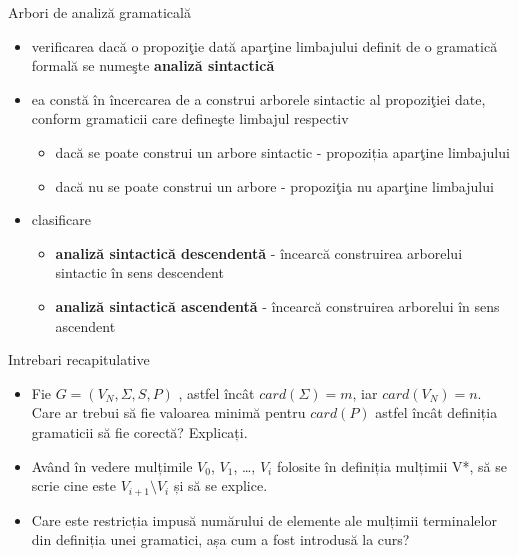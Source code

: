 \documentclass[pdf]{beamer}
\begin{document}
\begin{frame}{Arbori de analiză gramaticală}
\begin{itemize}
\item
verificarea dacă o propoziţie dată aparţine limbajului definit de o gramatică formală se numeşte \textbf{analiză sintactică}
\item
ea constă în încercarea de a construi arborele sintactic al propoziţiei date, conform gramaticii care defineşte limbajul respectiv
\begin{itemize}
\item
dacă se poate construi un arbore sintactic - propoziția aparţine limbajului
\item
dacă nu se poate construi un arbore - propoziţia nu aparţine limbajului
\end{itemize}
\item
clasificare
\begin{itemize}
\item
\textbf{analiză sintactică descendentă} - încearcă construirea arborelui sintactic în sens descendent
\item
\textbf{analiză sintactică ascendentă} - încearcă construirea arborelui în sens ascendent
\end{itemize}
\end{itemize}
\end{frame}



\begin{frame}{Intrebari recapitulative}
\begin{itemize}
\item
Fie $G = (V_{N}, \Sigma, S, P )$ , astfel încât $card(\Sigma)=m$, iar $card(V_{N})=n$. Care ar trebui să fie valoarea minimă pentru $card(P)$ astfel încât definiția gramaticii să fie corectă? Explicați.
\newline 

\item
Având în vedere mulțimile $V_0$, $V_1$, \dots, $V_i$ folosite în definiția mulțimii V*, să se scrie cine este $V_{i+1} \setminus V_i$ și să se explice.
\newline 

\item
Care este restricția impusă numărului de elemente ale mulțimii terminalelor din definiția unei gramatici, așa cum a fost introdusă la curs?

\end{itemize}
\end{frame}
\end{document}
